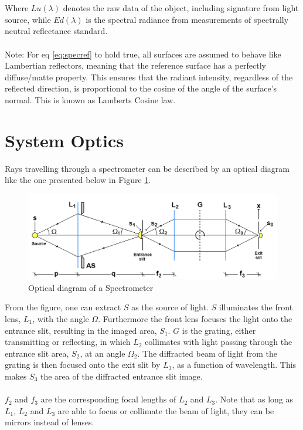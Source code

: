 \\\\
Where $Lu(\lambda)$ denotes the raw data of the object, including signature from light source, while $Ed(\lambda)$ is the spectral radiance from measurements of spectrally neutral reflectance standard.
\\\\
Note: For eq \ref{eq:specref} to hold true, all surfaces are assumed to behave like Lambertian reflectors, meaning that the reference surface has a perfectly diffuse/matte property. This ensures that the radiant intensity, regardless of the reflected direction, is proportional to the cosine of the angle of the surface's normal. This is known as Lamberts Cosine law. 



\vspace{1.3cm}
\section{System Optics} \label{sec:sysopt}
Rays travelling through a spectrometer can be described by an optical diagram like the one presented below in Figure \ref{fig:sysopt}.
\begin{figure}[H]
    \centering
    \includegraphics[width = 12cm]{Images/theory/sysop.png}
    \caption{Optical diagram of a Spectrometer}
    \label{fig:sysopt}
\end{figure}
\noindent
From the figure, one can extract $S$ as the source of light. $S$ illuminates the front lens, $L_1$, with the angle $\Omega$. Furthermore the front lens focuses the light onto the entrance slit, resulting in the imaged area, $S_1$. $G$ is the grating, either transmitting or reflecting, in which $L_2$ collimates with light passing through the entrance slit area, $S_2$, at an angle  $\Omega_2$. The diffracted beam of light from the grating is then focused onto the exit slit by $L_3$, as a function of wavelength. This makes $S_3$ the area of the diffracted entrance slit image. 
\\\\
$f_2$ and $f_3$ are the corresponding focal lengths of $L_2$ and $L_3$. Note that as long as $L_1$, $L_2$ and $L_3$ are able to focus or collimate the beam of light, they can be mirrors instead of lenses. 
\\\\
